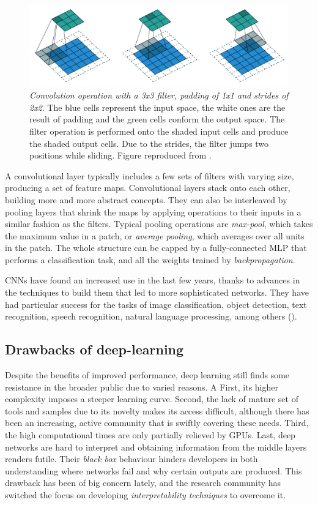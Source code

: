 	\begin{figure}
	\centering
	\includegraphics[width=0.8\linewidth]{Figures/padding}
	\caption{\textit{Convolution operation with a 3x3 filter, padding of 1x1 and strides of 2x2}. The blue cells represent the input space, the white ones are the result of padding and the green cells conform the output space. The filter operation is performed onto the shaded input cells and produce the shaded output cells. Due to the strides, the filter jumps two positions while sliding. Figure reproduced from \cite{Dumoulin2016}.}
	\label{fig:padding}
	\end{figure}
	
	A convolutional layer typically includes a few sets of filters with varying size, producing a set of feature maps. Convolutional layers stack onto each other, building more and more abstract concepts. They can also be interleaved by pooling layers that shrink the maps by applying operations to their inputs in a similar fashion as the filters. Typical pooling operations are \textit{max-pool}, which takes the maximum value in a patch, or \textit{average pooling}, which averages over all units in the patch. The whole structure can be capped by a fully-connected MLP that performs a classification task, and all the weights trained by \textit{backpropagation}.
	
	CNNs have found an increased use in the last few years, thanks to advances in the techniques to build them that led to more sophisticated networks. They have had particular success for the tasks of image classification, object detection, text recognition, speech recognition, natural language processing, among others (\cite{Gu2017}).
	
	\subsection{Drawbacks of deep-learning}
	Despite the benefits of improved performance, deep learning still finds some resistance in the broader public due to varied reasons. A First, its higher complexity imposes a steeper learning curve. Second, the lack of mature set of tools and samples due to its novelty makes its access difficult, although there has been an increasing, active community that is swiftly covering these needs. Third, the high computational times are only partially relieved by GPUs. Last, deep networks are hard to interpret and obtaining information from the middle layers renders futile. Their \textit{black box} behaviour hinders developers in both understanding where networks fail and why certain outputs are produced. This drawback has been of big concern lately, and the research community has switched the focus on developing \textit{interpretability techniques} to overcome it.
	
